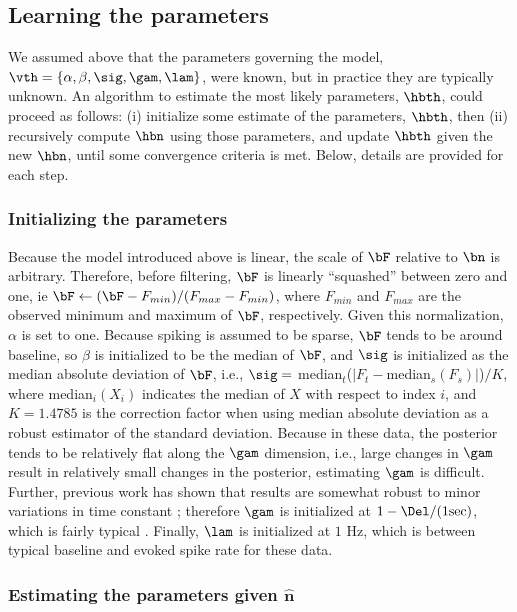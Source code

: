 \subsection{Learning the parameters} \label{sec:learn}

We assumed above that the parameters governing the model, $\vth=\{\alpha, \beta, \sig, \gam, \lam\}$, were known, but in practice they are typically unknown. An algorithm to estimate the most likely parameters, $\hbth$, could proceed as follows: (i) initialize some estimate of the parameters, $\hbth$, then (ii) recursively compute $\hbn$ using those parameters, and update $\hbth$ given the new $\hbn$, until some convergence criteria is met.  Below, details are provided for each step.

\subsubsection{Initializing the parameters} \label{sec:init}

Because the model introduced above is linear, the scale of $\bF$ relative to $\bn$ is arbitrary.  Therefore, before filtering, $\bF$ is linearly ``squashed'' between zero and one, ie $\bF \leftarrow (\bF - F_{min})/(F_{max}-F_{min})$, where $F_{min}$ and $F_{max}$ are the observed minimum and maximum of $\bF$, respectively.  Given this normalization, $\alpha$ is set to one.  Because spiking is assumed to be sparse, $\bF$ tends to be around baseline, so $\beta$ is initialized to be the median of $\bF$, and $\sig$ is initialized as the median absolute deviation of $\bF$, i.e.,  $\sig=$ median$_t$($|F_t-$median$_s(F_s)|$)$/K$, where median$_i(X_i)$ indicates the median of $X$ with respect to index $i$, and $K=1.4785$ is the correction factor when using median absolute deviation as a robust estimator of the standard deviation.  Because in these data, the posterior tends to be relatively flat along the $\gam$ dimension, i.e.,  large changes in $\gam$ result in relatively small changes in the posterior, estimating $\gam$ is difficult.  Further, previous work has shown that results are somewhat robust to minor variations in time constant \cite{YaksiFriedrich06}; therefore $\gam$ is initialized at $1-\Del/(1 \text{sec})$, which is fairly typical \cite{PologrutoSvoboda04}. Finally, $\lam$ is initialized at $1$ Hz, which is between typical baseline and evoked spike rate for these data.

\subsubsection{Estimating the parameters given $\widehat{\mathbf{n}}$} \label{sec:242}

